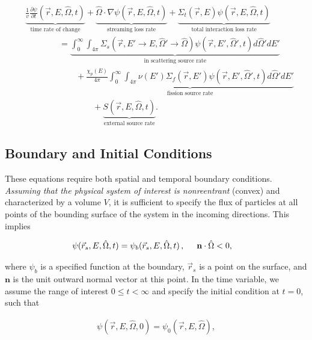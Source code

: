 \documentclass[12pt]{article}
\newcommand{\rvec}{\ensuremath{\vec{r}}}
\newcommand{\omvec}{\ensuremath{\hat{\Omega}}}
\begin{document}
\begin{align}
&\underbrace{\frac{1}{v}\frac{\partial \psi}{\partial t}(\rvec,E,\omvec,t)}_
            {\text{time rate of change}} + 
\underbrace{\omvec\cdot  \nabla \psi(\rvec,E,\omvec,t)}_
           {\text{streaming loss rate}} +
 \underbrace{\Sigma_t(\rvec,E)\psi(\rvec,E,\omvec,t) }_
            {\text{total interaction loss rate}}
\\& \quad\quad\quad\quad =
\underbrace{\int_0^{\infty}\int_{4\pi}
            \Sigma_s(\rvec, E'\rightarrow E,\omvec'\rightarrow\omvec)
            \psi(\rvec,E',\omvec',t)d\omvec'dE'}_
           {\text{in scattering source rate}}\nonumber
\\&\quad\quad\quad\quad\quad\quad +
\underbrace{\frac{\chi_p(E)}{4\pi}\int_0^{\infty}
            \int_{4\pi}\nu(E')\Sigma_f(\rvec,E')
            \psi(\rvec,E',\omvec',t)d\omvec'dE'}_
           {\text{fission source rate}}\nonumber
\\&\quad\quad\quad\quad\quad\quad\quad\quad+
\underbrace{S(\rvec, E, \omvec,t)}_{\text{external source rate}} \nonumber.
\end{align}   
   
\subsection*{Boundary and Initial Conditions}

These equations require both spatial and temporal boundary conditions.
\textit{Assuming that the physical system of interest is nonreentrant}
(convex) and characterized by a volume $V$, it is sufficient to specify the 
flux of particles at all points of the bounding surface of the system in the 
incoming directions. This implies

\begin{align*}
\psi(\rvec_s, E,\omvec,t) &=
\psi_b(\rvec_s,E,\omvec,t)\,, \hspace{0.5 cm} \textbf{n} \cdot \omvec <0,
\end{align*}

where $\psi_b$ is a specified function at the boundary, $\rvec_s$ is a point 
on the surface, and $\textbf{n}$ is the unit outward normal vector at this 
point. In the time variable, we assume the range of interest $0\leq t<\infty$ 
and specify the initial condition at $t=0$, such that

\begin{align*}
\psi(\rvec,E,\omvec,0) = \psi_0(\rvec,E,\omvec),
\end{align*}
\end{document}
